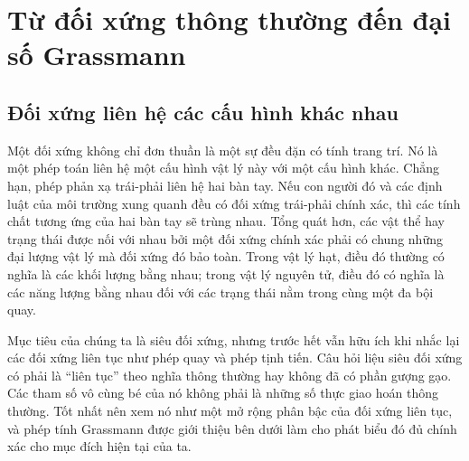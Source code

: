 \chapter{Từ đối xứng thông thường đến đại số Grassmann}


\section{Đối xứng liên hệ các cấu hình khác nhau}

Một đối xứng không chỉ đơn thuần là một sự đều đặn có tính trang trí. Nó là một phép toán liên hệ một cấu hình vật lý này với một cấu hình khác. Chẳng hạn, phép phản xạ trái-phải liên hệ hai bàn tay. Nếu con người đó và các định luật của môi trường xung quanh đều có đối xứng trái-phải chính xác, thì các tính chất tương ứng của hai bàn tay sẽ trùng nhau. Tổng quát hơn, các vật thể hay trạng thái được nối với nhau bởi một đối xứng chính xác phải có chung những đại lượng vật lý mà đối xứng đó bảo toàn. Trong vật lý hạt, điều đó thường có nghĩa là các khối lượng bằng nhau; trong vật lý nguyên tử, điều đó có nghĩa là các năng lượng bằng nhau đối với các trạng thái nằm trong cùng một đa bội quay.

Mục tiêu của chúng ta là siêu đối xứng, nhưng trước hết vẫn hữu ích khi nhắc lại các đối xứng liên tục như phép quay và phép tịnh tiến. Câu hỏi liệu siêu đối xứng có phải là “liên tục” theo nghĩa thông thường hay không đã có phần gượng gạo. Các tham số vô cùng bé của nó không phải là những số thực giao hoán thông thường. Tốt nhất nên xem nó như một mở rộng phân bậc của đối xứng liên tục, và phép tính Grassmann được giới thiệu bên dưới làm cho phát biểu đó đủ chính xác cho mục đích hiện tại của ta. 

